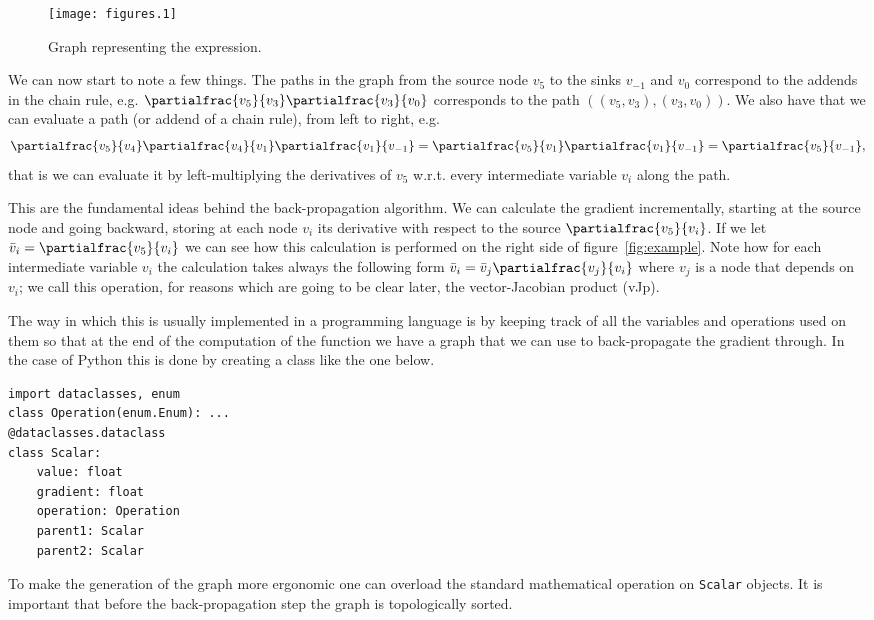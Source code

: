 \documentclass{article}
\begin{document}
\begin{figure}
\centering
\texttt{[image: figures.1]}
\label{fig:dag}
\caption{Graph representing the expression.}
\end{figure}

We can now start to note a few things. The paths in the graph from the source
node \(v_5\) to the sinks \(v_{-1}\) and \(v_0\) correspond to the addends in
the chain rule, e.g. \(\partialfrac{v_5}{v_3}\partialfrac{v_3}{v_0}\)
corresponds to the path \(((v_5,v_3), (v_3,v_0))\). We also have that we can
evaluate a path (or addend of a chain rule), from left to right, e.g. \[
\partialfrac{v_5}{v_4}\partialfrac{v_4}{v_1}\partialfrac{v_1}{v_{-1}}
= \partialfrac{v_5}{v_1}\partialfrac{v_1}{v_{-1}}
= \partialfrac{v_5}{v_{-1}},\]
that is we can evaluate it by left-multiplying the derivatives of \(v_5\)
w.r.t. every intermediate variable \(v_i\) along the path.

This are the fundamental ideas behind the back-propagation algorithm. We
can calculate the gradient incrementally, starting at the source node and going
backward, storing at each node \(v_i\) its derivative with respect to the
source \(\partialfrac{v_5}{v_i}\). If we let \(\bar v_i =
\partialfrac{v_5}{v_i}\) we can see how this calculation is performed on the
right side of figure~\ref{fig:example}. Note how for each intermediate variable
\(v_i\) the calculation takes always the following form
\(\bar v_i = \bar v_j \partialfrac{v_j}{v_i}\) where \(v_j\) is a node that
depends on \(v_i\); we call this operation, for reasons which are going to be
clear later, the vector-Jacobian product (vJp).

The way in which this is usually implemented in a programming language is by
keeping track of all the variables and operations used on them so that at the
end of the computation of the function we have a graph that we can use to
back-propagate the gradient through. In the case of Python this is done by
creating a class like the one below.

\begin{verbatim}
import dataclasses, enum
class Operation(enum.Enum): ...
@dataclasses.dataclass
class Scalar:
    value: float
    gradient: float
    operation: Operation
    parent1: Scalar
    parent2: Scalar
\end{verbatim}

To make the generation of the graph more ergonomic one can overload the standard
mathematical operation on \texttt{Scalar} objects. It is important that before
the back-propagation step the graph is topologically sorted.
\end{document}
